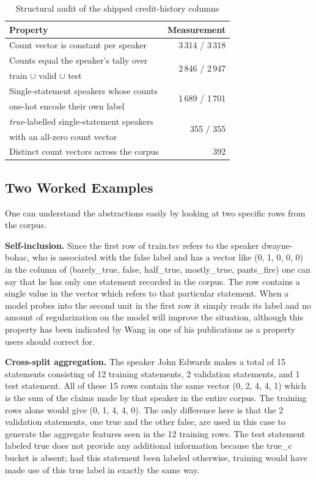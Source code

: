 \documentclass[10pt,twocolumn,twoside,a4paper]{article}
\begin{document}
\begin{table}[t]
\caption{Structural audit of the shipped credit-history columns}
\label{tab:audit}
\centering
\footnotesize
\begin{tabular}{@{}lr@{}}
\toprule
Property & Measurement \\
\midrule
Count vector is constant per speaker & 3\,314 / 3\,318 \\
Counts equal the speaker's tally over & \multirow{2}{*}{2\,846 / 2\,947} \\
\quad train $\cup$ valid $\cup$ test & \\
Single-statement speakers whose counts & \multirow{2}{*}{1\,689 / 1\,701} \\
\quad one-hot encode their own label & \\
\emph{true}-labelled single-statement speakers & \multirow{2}{*}{355 / 355} \\
\quad with an all-zero count vector & \\
Distinct count vectors across the corpus & 392 \\
\bottomrule
\end{tabular}
\end{table}

\subsection{Two Worked Examples}

One can understand the abstractions easily by looking at two specific rows from the corpus.

\textbf{Self-inclusion.} Since the first row of train.tsv refers to the speaker dwayne-bohac, who is associated with the false label and has a vector like (0, 1, 0, 0, 0) in the column of (barely\_true, false, half\_true, mostly\_true, pants\_fire) one can say that he has only one statement recorded in the corpus. The row contains a single value in the vector which refers to that particular statement. When a model probes into the second unit in the first row it simply reads its label and no amount of regularization on the model will improve the situation, although this property has been indicated by Wang in one of his publications as a property users should correct for.

\textbf{Cross-split aggregation.} The speaker John Edwards makes a total of 15 statements consisting of 12 training statements, 2 validation statements, and 1 test statement. All of these 15 rows contain the same vector (0, 2, 4, 4, 1) which is the sum of the claims made by that speaker in the entire corpus. The training rows alone would give (0, 1, 4, 4, 0). The only difference here is that the 2 validation statements, one true and the other false, are used in this case to generate the aggregate features seen in the 12 training rows. The test statement labeled true does not provide any additional information because the true\_c bucket is absent; had this statement been labeled otherwise, training would have made use of this true label in exactly the same way.
\end{document}
